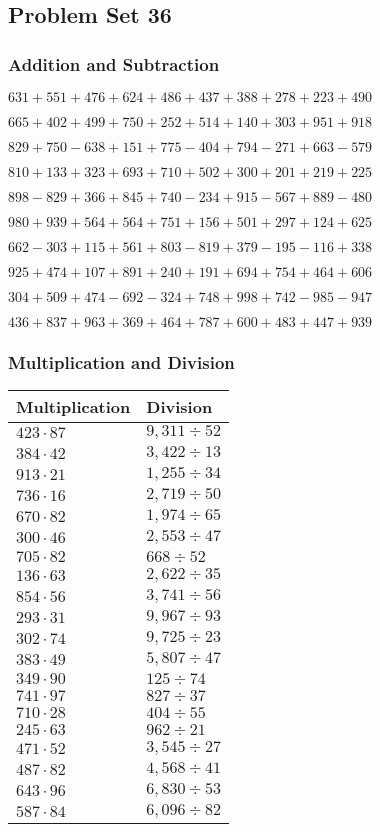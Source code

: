 \hypertarget{problem-set-36-2}{%
\subsection{Problem Set 36}\label{problem-set-36-2}}

\hypertarget{addition-and-subtraction-136}{%
\subsubsection{Addition and
Subtraction}\label{addition-and-subtraction-136}}

\(631 + 551 + 476 + 624 + 486 + 437 + 388 + 278 + 223 + 490\)

\(665 + 402 + 499 + 750 + 252 + 514 + 140 + 303 + 951 + 918\)

\(829 + 750 - 638 + 151 + 775 - 404 + 794 - 271 + 663 - 579\)

\(810 + 133 + 323 + 693 + 710 + 502 + 300 + 201 + 219 + 225\)

\(898 - 829 + 366 + 845 + 740 - 234 + 915 - 567 + 889 - 480\)

\(980 + 939 + 564 + 564 + 751 + 156 + 501 + 297 + 124 + 625\)

\(662 - 303 + 115 + 561 + 803 - 819 + 379 - 195 - 116 + 338\)

\(925 + 474 + 107 + 891 + 240 + 191 + 694 + 754 + 464 + 606\)

\(304 + 509 + 474 - 692 - 324 + 748 + 998 + 742 - 985 - 947\)

\(436 + 837 + 963 + 369 + 464 + 787 + 600 + 483 + 447 + 939\)

\hypertarget{multiplication-and-division-136}{%
\subsubsection{Multiplication and
Division}\label{multiplication-and-division-136}}

\begin{longtable}[]{@{}ll@{}}
\toprule
Multiplication & Division\tabularnewline
\midrule
\endhead
\(423 \cdot 87\) & \(9,311÷52\)\tabularnewline
\(384 \cdot 42\) & \(3,422÷13\)\tabularnewline
\(913 \cdot 21\) & \(1,255÷34\)\tabularnewline
\(736 \cdot 16\) & \(2,719÷50\)\tabularnewline
\(670 \cdot 82\) & \(1,974÷65\)\tabularnewline
\(300 \cdot 46\) & \(2,553÷47\)\tabularnewline
\(705 \cdot 82\) & \(668÷52\)\tabularnewline
\(136 \cdot 63\) & \(2,622÷35\)\tabularnewline
\(854 \cdot 56\) & \(3,741÷56\)\tabularnewline
\(293 \cdot 31\) & \(9,967÷93\)\tabularnewline
\(302 \cdot 74\) & \(9,725÷23\)\tabularnewline
\(383 \cdot 49\) & \(5,807÷47\)\tabularnewline
\(349 \cdot 90\) & \(125÷74\)\tabularnewline
\(741 \cdot 97\) & \(827÷37\)\tabularnewline
\(710 \cdot 28\) & \(404÷55\)\tabularnewline
\(245 \cdot 63\) & \(962÷21\)\tabularnewline
\(471 \cdot 52\) & \(3,545÷27\)\tabularnewline
\(487 \cdot 82\) & \(4,568÷41\)\tabularnewline
\(643 \cdot 96\) & \(6,830÷53\)\tabularnewline
\(587 \cdot 84\) & \(6,096÷82\)\tabularnewline
\bottomrule
\end{longtable}

